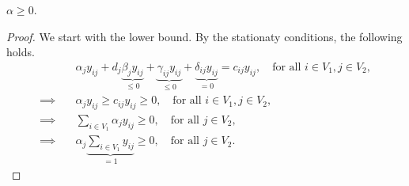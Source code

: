\begin{proposition}
    $\alpha \ge 0$.
\end{proposition}
\begin{proof}
    We start with the lower bound. By the stationaty conditions, the following
    holds.
    \begin{align*}
        & \alpha_j y_{ij} + d_j \underbrace{\beta_j y_{ij}}_{\le 0} + \underbrace{\gamma_{ij} y_{ij}}_{\le 0} + \underbrace{\delta_{ij} y_{ij}}_{= 0} 
        = c_{ij} y_{ij}, \quad \text{for all } i\in V_1, j\in V_2,  \\
        \implies\quad & \alpha_j y_{ij} \ge c_{ij} y_{ij} \ge 0, \quad \text{for all } i\in V_1, j\in V_2, \\
        \implies\quad & \sum_{i\in V_1} \alpha_j y_{ij} \ge 0, \quad\text{for all } j\in V_2, \\
        \implies\quad & \alpha_j \underbrace{\sum_{i\in V_1} y_{ij}}_{=1} \ge 0, \quad \text{for all } j\in V_2.
    \end{align*}
\end{proof}
